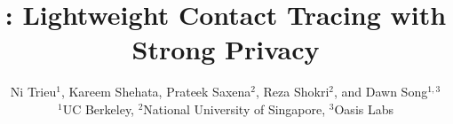 \newcommand{\remove}[1]{}

\newcommand{\Fgc}{\mathcal{GC}}
\newcommand{\G}{G }
\newcommand{\abs}[1]{\lvert#1\rvert}
\newcommand{\ceil}[1]{{\lceil{#1}\rceil}}

\newcommand{\Z}{\mathbb{Z}}
\newenvironment{proof_sketch}{\quad\par\noindent{\bf Sketch of proof:~~}}{\qed\quad}


\newcommand{\mathhighlight}[1]{\basehighlight{$#1$}}
\newcommand{\highlight}[1]{\raisebox{0pt}[-\fboxsep][-\fboxsep]{\basehighlight{#1}}}
\newcommand{\highlightline}[1]{%
	\hspace*{-\fboxsep}\basehighlight{#1}%
}

\newcommand{\basehighlight}[1]{\colorbox{highlightcolor}{\color{highlighttextcolor}#1}}





\title{\dect: Lightweight  Contact Tracing with Strong Privacy}
	
\author{Ni Trieu$^1$, Kareem Shehata, Prateek Saxena$^2$, Reza Shokri$^2$, and Dawn Song$^{1,3}$ \\
$^1$UC Berkeley, $^2$National University of Singapore, $^3$Oasis Labs}


	
	

\maketitle 

